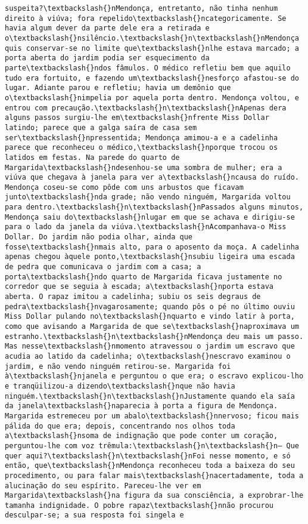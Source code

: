 \begin{Verbatim}[commandchars=\\\{\}]
suspeita?\textbackslash{}nMendonça, entretanto, não tinha nenhum direito à viúva; fora repelido\textbackslash{}ncategoricamente. Se havia algum dever da parte dele era a retirada e o\textbackslash{}nsilêncio.\textbackslash{}n\textbackslash{}nMendonça quis conservar-se no limite que\textbackslash{}nlhe estava marcado; a porta aberta do jardim podia ser esquecimento da parte\textbackslash{}ndos fâmulos. O médico refletiu bem que aquilo tudo era fortuito, e fazendo um\textbackslash{}nesforço afastou-se do lugar. Adiante parou e refletiu; havia um demônio que o\textbackslash{}nimpelia por aquela porta dentro. Mendonça voltou, e entrou com precaução.\textbackslash{}n\textbackslash{}nApenas dera alguns passos surgiu-lhe em\textbackslash{}nfrente Miss Dollar latindo; parece que a galga saíra de casa sem ser\textbackslash{}npressentida; Mendonça amimou-a e a cadelinha parece que reconheceu o médico,\textbackslash{}nporque trocou os latidos em festas. Na parede do quarto de Margarida\textbackslash{}ndesenhou-se uma sombra de mulher; era a viúva que chegava à janela para ver a\textbackslash{}ncausa do ruído. Mendonça coseu-se como pôde com uns arbustos que ficavam junto\textbackslash{}nda grade; não vendo ninguém, Margarida voltou para dentro.\textbackslash{}n\textbackslash{}nPassados alguns minutos, Mendonça saiu do\textbackslash{}nlugar em que se achava e dirigiu-se para o lado da janela da viúva.\textbackslash{}nAcompanhava-o Miss Dollar. Do jardim não podia olhar, ainda que fosse\textbackslash{}nmais alto, para o aposento da moça. A cadelinha apenas chegou àquele ponto,\textbackslash{}nsubiu ligeira uma escada de pedra que comunicava o jardim com a casa; a porta\textbackslash{}ndo quarto de Margarida ficava justamente no corredor que se seguia à escada; a\textbackslash{}nporta estava aberta. O rapaz imitou a cadelinha; subiu os seis degraus de pedra\textbackslash{}nvagarosamente; quando pôs o pé no último ouviu Miss Dollar pulando no\textbackslash{}nquarto e vindo latir à porta, como que avisando a Margarida de que se\textbackslash{}naproximava um estranho.\textbackslash{}n\textbackslash{}nMendonça deu mais um passo. Mas nesse\textbackslash{}nmomento atravessou o jardim um escravo que acudia ao latido da cadelinha; o\textbackslash{}nescravo examinou o jardim, e não vendo ninguém retirou-se. Margarida foi à\textbackslash{}njanela e perguntou o que era; o escravo explicou-lho e tranqüilizou-a dizendo\textbackslash{}nque não havia ninguém.\textbackslash{}n\textbackslash{}nJustamente quando ela saía da janela\textbackslash{}naparecia à porta a figura de Mendonça. Margarida estremeceu por um abalo\textbackslash{}nnervoso; ficou mais pálida do que era; depois, concentrando nos olhos toda a\textbackslash{}nsoma de indignação que pode conter um coração, perguntou-lhe com voz trêmula:\textbackslash{}n\textbackslash{}n— Que quer aqui?\textbackslash{}n\textbackslash{}nFoi nesse momento, e só então, que\textbackslash{}nMendonça reconheceu toda a baixeza do seu procedimento, ou para falar mais\textbackslash{}nacertadamente, toda a alucinação do seu espírito. Pareceu-lhe ver em Margarida\textbackslash{}na figura da sua consciência, a exprobrar-lhe tamanha indignidade. O pobre rapaz\textbackslash{}nnão procurou desculpar-se; a sua resposta foi singela e 
\end{Verbatim}
